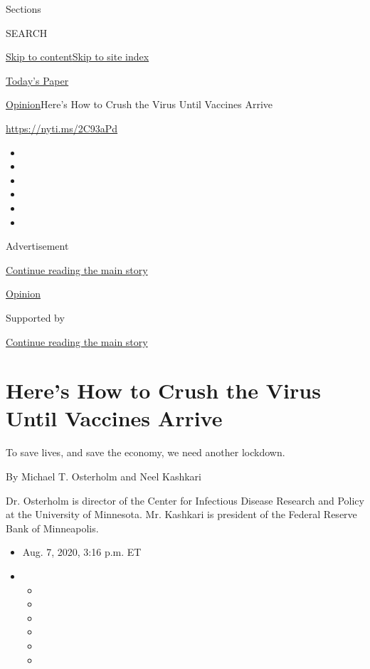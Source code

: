 Sections

SEARCH

\protect\hyperlink{site-content}{Skip to
content}\protect\hyperlink{site-index}{Skip to site index}

\href{https://myaccount.nytimes3xbfgragh.onion/auth/login?response_type=cookie\&client_id=vi}{}

\href{https://www.nytimes3xbfgragh.onion/section/todayspaper}{Today's
Paper}

\href{/section/opinion}{Opinion}\textbar{}Here's How to Crush the Virus
Until Vaccines Arrive

\url{https://nyti.ms/2C93aPd}

\begin{itemize}
\item
\item
\item
\item
\item
\item
\end{itemize}

Advertisement

\protect\hyperlink{after-top}{Continue reading the main story}

\href{/section/opinion}{Opinion}

Supported by

\protect\hyperlink{after-sponsor}{Continue reading the main story}

\hypertarget{heres-how-to-crush-the-virus-until-vaccines-arrive}{%
\section{Here's How to Crush the Virus Until Vaccines
Arrive}\label{heres-how-to-crush-the-virus-until-vaccines-arrive}}

To save lives, and save the economy, we need another lockdown.

By Michael T. Osterholm and Neel Kashkari

Dr. Osterholm is director of the Center for Infectious Disease Research
and Policy at the University of Minnesota. Mr. Kashkari is president of
the Federal Reserve Bank of Minneapolis.

\begin{itemize}
\item
  Aug. 7, 2020, 3:16 p.m. ET
\item
  \begin{itemize}
  \item
  \item
  \item
  \item
  \item
  \item
  \end{itemize}
\end{itemize}

